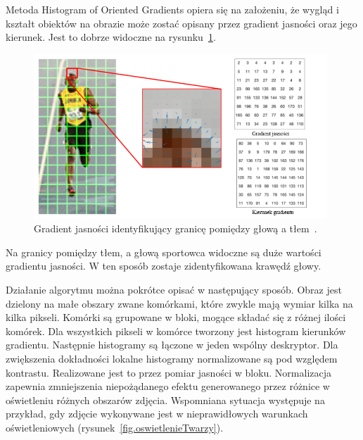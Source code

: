 \documentclass[a4paper,twoside,12pt]{book}
\begin{document}
    Metoda Histogram of Oriented Gradients opiera się na założeniu, że wygląd i kształt obiektów na obrazie może zostać
    opisany przez gradient jasności oraz jego kierunek. Jest to dobrze widoczne na
    rysunku~\ref{fig.gradientJasnosciNaGlowie}.
    \begin{figure}[b]
        \centering
        \includegraphics[width=11cm]{Obrazy/gradientJasnosciNaGlowie.jpg}
        \caption{Gradient jasności identyfikujący granicę pomiędzy głową a tłem~\cite{hogOpenCv}.}
        \label{fig.gradientJasnosciNaGlowie}
    \end{figure}
    Na granicy pomiędzy tłem, a głową sportowca widoczne są duże wartości gradientu jasności.
    W ten sposób zostaje zidentyfikowana krawędź głowy.

    Działanie algorytmu można pokrótce opisać w następujący sposób. Obraz jest dzielony na małe obszary zwane komórkami,
    które zwykle mają wymiar kilka na kilka pikseli. Komórki są grupowane w bloki, mogące składać się z różnej ilości
    komórek.
    Dla wszystkich pikseli w komórce tworzony jest histogram kierunków gradientu.
    Następnie histogramy są łączone w jeden wspólny deskryptor.
    Dla zwiększenia dokładności lokalne histogramy normalizowane są pod względem kontrastu.
    Realizowane jest to przez pomiar jasności w bloku. Normalizacja zapewnia zmniejszenia niepożądanego efektu
    generowanego przez
    różnice w oświetleniu różnych obszarów zdjęcia. Wspomniana sytuacja występuje na przykład, gdy zdjęcie wykonywane
    jest w nieprawidłowych warunkach oświetleniowych (rysunek~\ref{fig.oswietlenieTwarzy}).
\end{document}
